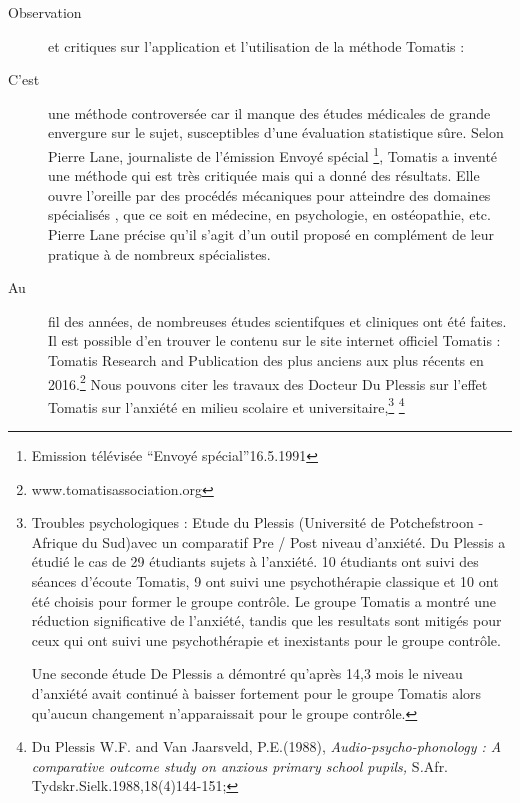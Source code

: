 \begin{description}
\item [{Observation}] et critiques sur l'application et l'utilisation de
la méthode Tomatis : 
\item [{C'est}] une méthode controversée car il manque des études médicales
de grande envergure sur le sujet, susceptibles d'une évaluation statistique
sûre. Selon Pierre Lane, journaliste de l'émission Envoyé spécial
\footnote{Emission télévisée ``Envoyé spécial''16.5.1991}, Tomatis
a inventé une méthode qui est très critiquée mais qui a donné des
résultats. Elle ouvre l'oreille par des procédés mécaniques pour atteindre
des domaines spécialisés , que ce soit en médecine, en psychologie,
en ostéopathie, etc. Pierre Lane précise qu'il s'agit d'un outil proposé
en complément de leur pratique à de nombreux spécialistes. 
\item [{Au}] fil des années, de nombreuses études scientifques et cliniques
ont été faites. Il est possible d'en trouver le contenu sur le site
internet officiel Tomatis : Tomatis Research and Publication des plus
anciens aux plus récents en 2016.\footnote{www.tomatisassociation.org}
Nous pouvons citer les travaux des Docteur Du Plessis sur l'effet
Tomatis sur l'anxiété en milieu scolaire et universitaire,\footnote{Troubles psychologiques : Etude du Plessis (Université de Potchefstroon
- Afrique du Sud)avec un comparatif Pre / Post niveau d\textquoteright anxiété.
Du Plessis a étudié le cas de 29 étudiants sujets à l\textquoteright anxiété.
10 étudiants ont suivi des séances d\textquoteright écoute Tomatis\textregistered ,
9 ont suivi une psychothérapie classique et 10 ont été choisis pour
former le groupe contrôle. Le groupe Tomatis\textregistered{} a montré
une réduction significative de l\textquoteright anxiété, tandis que
les resultats sont mitigés pour ceux qui ont suivi une psychothérapie
et inexistants pour le groupe contrôle.

Une seconde étude De Plessis a démontré qu\textquoteright après 14,3
mois le niveau d\textquoteright anxiété avait continué à baisser fortement
pour le groupe Tomatis\textregistered{} alors qu\textquoteright aucun
changement n\textquoteright apparaissait pour le groupe contrôle.} \footnote{Du Plessis W.F. and Van Jaarsveld, P.E.(1988), \emph{Audio-psycho-phonology
: A comparative outcome study on anxious primary school pupils, }S\emph{.}Afr.
Tydskr.Sielk.1988,18(4)144-151;

}
\end{description}
